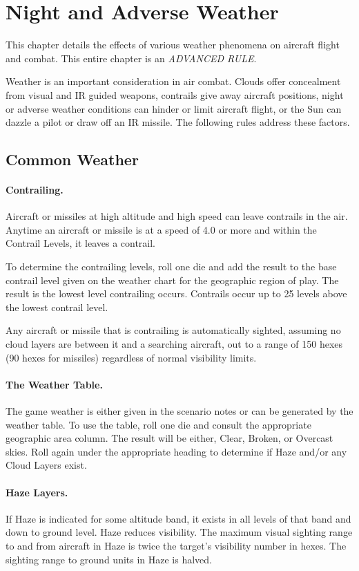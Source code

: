 \section{Night and Adverse Weather}

This chapter details the effects of various weather phenomena on aircraft flight and combat. This entire chapter is an \emph{ADVANCED RULE}.

Weather is an important consideration in air combat. Clouds offer concealment from visual and IR guided weapons, contrails give away aircraft positions, night or adverse weather conditions can hinder or limit aircraft flight, or the Sun can dazzle a pilot or draw off an IR missile. The following rules address these factors.

\subsection{Common Weather}

\paragraph{Contrailing.} Aircraft or missiles at high altitude and high speed can leave contrails in the air. Anytime an aircraft or missile is at a speed of 4.0 or more and within the Contrail Levels, it leaves a contrail.

To determine the contrailing levels, roll one die and add the result to the base contrail level given on the weather chart for the geographic region of play. The result is the lowest level contrailing occurs. Contrails occur up to 25 levels above the lowest contrail level.

Any aircraft or missile that is contrailing is automatically sighted, assuming no cloud layers are between it and a searching aircraft, out to a range of 150 hexes (90 hexes for missiles) regardless of normal visibility limits.

\paragraph{The Weather Table.} The game weather is either given in the scenario notes or can be generated by the weather table. To use the table, roll one die and consult the appropriate geographic area column.  The result will be either, Clear, Broken, or Overcast skies. Roll again under the appropriate heading to determine if Haze and/or any Cloud Layers exist.

\paragraph{Haze Layers.} If Haze is indicated for some altitude band, it exists in all levels of that band and down to ground level. Haze reduces visibility. The maximum visual sighting range to and from aircraft in Haze is twice the target's visibility number in hexes. The sighting range to ground units in Haze is halved.

